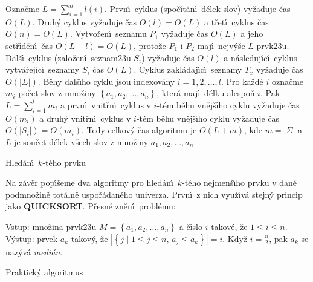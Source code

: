\flushpar Ozna\v cme $L=\sum_{i=1}^nl\left(i\right)$. Prvn\'\i\ cyklus (spo\v c\'\i t\'an\'\i\ 
d\'elek slov) vy\-\v zaduje \v cas $O\left(L\right)$. Druh\'y cyklus vy\v zaduje 
\v cas $O\left(l\right)=O\left(L\right)$ a t\v ret\'\i\ cyklus \v cas $O\left(n\right)=O\left(L\right)$. Vytvo\v ren\'\i\ 
seznamu $P_1$ vy\v zaduje \v cas $O\left(L\right)$ a jeho set\v r\'\i d\v en\'\i\ 
\v cas $O\left(L+l\right)=O\left(L\right)$, proto\v ze $P_1$ i $P_2$ maj\'\i\ nejv\'y\v se $
L$ 
prvk\accent23u. Dal\v s\'\i\ cyklus (zalo\v zen\'\i\ seznam\accent23u 
$S_i$) vy\v zaduje \v cas $O\left(l\right)$ a n\'asleduj\'\i c\'\i\ cyklus vytv\'a\v rej\'\i c\'\i\ 
seznamy $S_i$ \v cas $O\left(L\right)$. Cyklus zakl\'adaj\'\i c\'\i\ 
seznamy $T_x$ vy\v zaduje \v cas $O\left(|\Sigma |\right)$. B\v ehy dal\v s\'\i ho cyklu jsou 
indexov\'any $i=1,2,\dots,l$. Pro ka\v zd\'e $i$ ozna\v cme $m_i$ po\v cet slov z 
mno\v ziny $\left\{a_1,a_2,\dots,a_n\right\}$, kter\'a maj\'\i\ d\'elku alespo\v n $
i$. Pak 
$L=\sum_{i=1}^lm_i$ a prvn\'\i\ vnit\v rn\'\i\ cyklus v $i$-t\'em b\v ehu vn\v ej\v s\'\i ho 
cyklu vy\v zaduje \v cas $O\left(m_i\right)$ a druh\'y vnit\v rn\'\i\ cyklus v $
i$-t\'em 
b\v ehu vn\v ej\v s\'\i ho cyklu vy\v zaduje \v cas $O\left(|S_i|\right)=O\left(m_
i\right)$. Tedy 
celkov\'y \v cas algoritmu je $O\left(L+m\right)$, kde $m=|\Sigma |$ a $L$ 
je sou\v cet d\'elek v\v sech slov z mno\v ziny $a_1,a_2,\dots,a_
n$.
\medskip

\subhead
Hled\'an\'\i\ $k$-t\'eho prvku
\endsubhead
\smallskip

\flushpar Na z\'av\v er pop\'\i\v seme dva algoritmy pro hled\'an\'\i\ $
k$-t\'eho 
nejmen\v s\'\i\-ho prvku v dan\'e podmno\v zin\v e tot\'aln\v e 
uspo\v r\'adan\'e\-ho univerza. Prv\-n\'\i\ z nich vyu\v z\'\i v\'a  
stejn\'y princip jako {\bf QUICKSORT}. P\v res\-n\'e zn\v e\-n\'\i\ 
probl\'emu:
\medskip

\flushpar Vstup: mno\v zina prvk\accent23u $M=\left\{a_1,a_2,\dots,a_n
\right\}$ a \v c\'\i slo $i$ takov\'e, 
\v ze $1\le i\le n$.\newline 
V\'ystup: prvek $a_k$ takov\'y, \v ze 
$|\left\{j\mid 1\le j\le n,\,a_j\le a_k\right\}|=i$.\newline 
Kdy\v z $i=\frac n2$, pak $a_k$ se naz\'yv\'a \emph{medi\'an}.
\medskip

\subhead
Praktick\'y algoritmus
\endsubhead
\medskip

